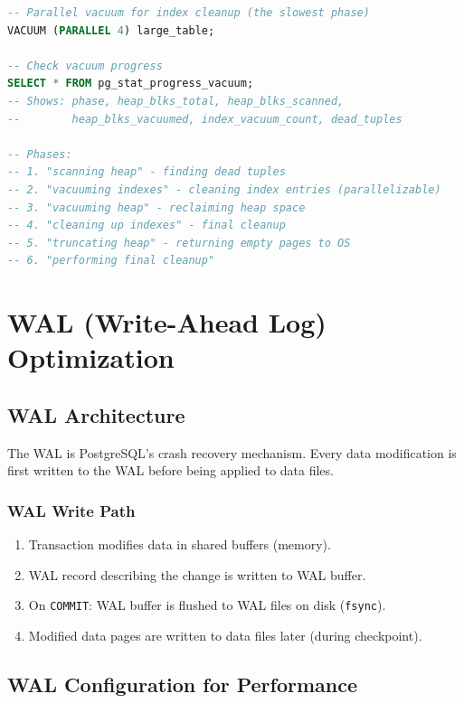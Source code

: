 \documentclass[12pt,a4paper]{article}
\begin{document}
\begin{lstlisting}[language=SQL, caption={Parallel vacuum}]
-- Parallel vacuum for index cleanup (the slowest phase)
VACUUM (PARALLEL 4) large_table;

-- Check vacuum progress
SELECT * FROM pg_stat_progress_vacuum;
-- Shows: phase, heap_blks_total, heap_blks_scanned,
--        heap_blks_vacuumed, index_vacuum_count, dead_tuples

-- Phases:
-- 1. "scanning heap" - finding dead tuples
-- 2. "vacuuming indexes" - cleaning index entries (parallelizable)
-- 3. "vacuuming heap" - reclaiming heap space
-- 4. "cleaning up indexes" - final cleanup
-- 5. "truncating heap" - returning empty pages to OS
-- 6. "performing final cleanup"
\end{lstlisting}


\section{WAL (Write-Ahead Log) Optimization}

\subsection{WAL Architecture}

The WAL is PostgreSQL's crash recovery mechanism. Every data modification is first written to the WAL before being applied to data files.

\subsubsection{WAL Write Path}

\begin{enumerate}
    \item Transaction modifies data in shared buffers (memory).
    \item WAL record describing the change is written to WAL buffer.
    \item On \texttt{COMMIT}: WAL buffer is flushed to WAL files on disk (\texttt{fsync}).
    \item Modified data pages are written to data files later (during checkpoint).
\end{enumerate}

\subsection{WAL Configuration for Performance}
\end{document}
